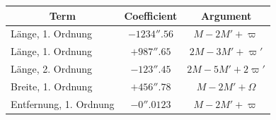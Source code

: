 \documentclass[12pt,a4paper]{article}
\begin{document}
\begin{center}
\begin{tabular}{|l|c|c|}
\hline
\multicolumn{1}{|c|}{Term} & \multicolumn{1}{c|}{Coefficient} & \multicolumn{1}{c|}{Argument} \\
\hline
L\"{a}nge, 1. Ordnung & $-1234''.56$ & $M - 2M' + \varpi$ \\
L\"{a}nge, 1. Ordnung & $+ 987''.65$ & $2M - 3M' + \varpi'$ \\
L\"{a}nge, 2. Ordnung & $- 123''.45$ & $2M - 5M' + 2\varpi'$ \\
Breite, 1. Ordnung & $+ 456''.78$ & $M - 2M' + \Omega$ \\
Entfernung, 1. Ordnung & $- 0''.0123$ & $M - 2M' + \varpi$ \\
\hline
\end{tabular}
\end{center}
\end{document}
